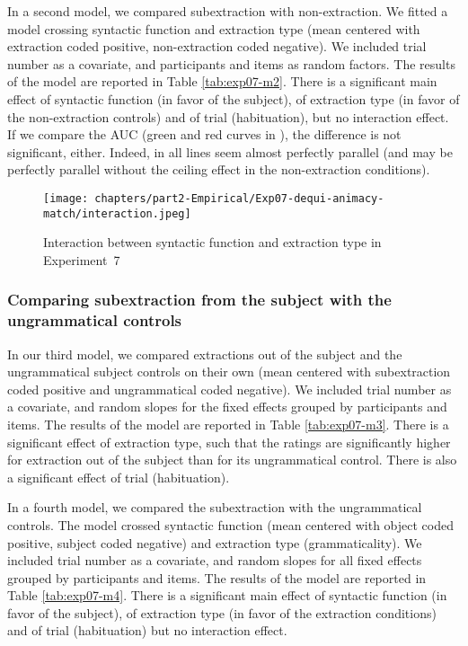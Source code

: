 

In a second model, we compared subextraction with non-extraction. We fitted a model crossing syntactic function and extraction type (mean centered with extraction coded positive, non-extraction coded negative). We included trial number as a covariate, and participants and items as random factors. The results of the model are reported in Table \ref{tab:exp07-m2}. 
There is a significant main effect of syntactic function (in favor of the subject), of extraction type (in favor of the non-extraction controls) and of trial (habituation), but no interaction effect. If we compare the AUC (green and red curves in ), the difference is not significant, either. Indeed, in  all lines seem almost perfectly parallel (and may be perfectly parallel without the ceiling effect in the non-extraction conditions). 



\begin{figure}
    \centering
    \texttt{[image: chapters/part2-Empirical/Exp07-dequi-animacy-match/interaction.jpeg]}
    \caption{Interaction between syntactic function and extraction type in Experiment~7}
    \label{fig:exp07-interaction}
\end{figure}

\subsubsection{Comparing subextraction from the subject with the ungrammatical controls}

In our third model, we compared extractions out of the subject and the ungrammatical subject controls on their own (mean centered with subextraction coded positive and ungrammatical coded negative). We included trial number as a covariate, and random slopes for the fixed effects grouped by participants and items. The results of the model are reported in Table \ref{tab:exp07-m3}. There is a significant effect of extraction type, such that the ratings are significantly higher for extraction out of the subject than for its ungrammatical control. There is also a significant effect of trial (habituation).



In a fourth model, we compared the subextraction with the ungrammatical controls. The model crossed syntactic function (mean centered with object coded positive, subject coded negative) and extraction type (grammaticality). We included trial number as a covariate, and random slopes for all fixed effects grouped by participants and items. The results of the model are reported in Table \ref{tab:exp07-m4}. 
There is a significant main effect of syntactic function (in favor of the subject), of extraction type (in favor of the extraction conditions) and of trial (habituation) but no interaction effect.

